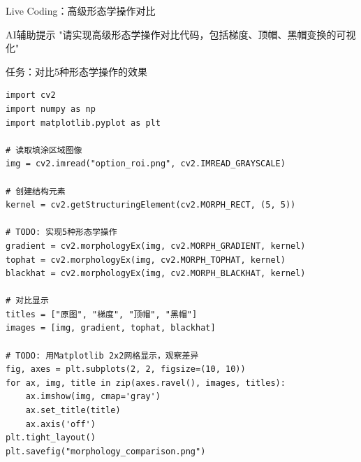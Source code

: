 \begin{frame}[fragile]{Live Coding：高级形态学操作对比}
    \begin{block}{AI辅助提示}
        \aihint{} "请实现高级形态学操作对比代码，包括梯度、顶帽、黑帽变换的可视化"
    \end{block}

    \begin{block}{任务：对比5种形态学操作的效果}
    \begin{lstlisting}[basicstyle=\ttfamily\scriptsize]
import cv2
import numpy as np
import matplotlib.pyplot as plt

# 读取填涂区域图像
img = cv2.imread("option_roi.png", cv2.IMREAD_GRAYSCALE)

# 创建结构元素
kernel = cv2.getStructuringElement(cv2.MORPH_RECT, (5, 5))

# TODO: 实现5种形态学操作
gradient = cv2.morphologyEx(img, cv2.MORPH_GRADIENT, kernel)
tophat = cv2.morphologyEx(img, cv2.MORPH_TOPHAT, kernel)
blackhat = cv2.morphologyEx(img, cv2.MORPH_BLACKHAT, kernel)

# 对比显示
titles = ["原图", "梯度", "顶帽", "黑帽"]
images = [img, gradient, tophat, blackhat]

# TODO: 用Matplotlib 2x2网格显示，观察差异
fig, axes = plt.subplots(2, 2, figsize=(10, 10))
for ax, img, title in zip(axes.ravel(), images, titles):
    ax.imshow(img, cmap='gray')
    ax.set_title(title)
    ax.axis('off')
plt.tight_layout()
plt.savefig("morphology_comparison.png")
    \end{lstlisting}
    \end{block}
\end{frame}

